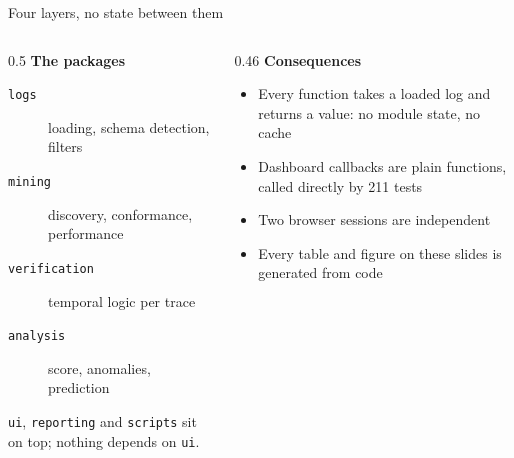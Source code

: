 \documentclass[aspectratio=169]{beamer}
\begin{document}
\begin{frame}{Four layers, no state between them}
\begin{columns}[T]
\begin{column}{0.5\textwidth}
\textbf{The packages}
\begin{description}
  \item[\texttt{logs}] loading, schema detection, filters
  \item[\texttt{mining}] discovery, conformance, performance
  \item[\texttt{verification}] temporal logic per trace
  \item[\texttt{analysis}] score, anomalies, prediction
\end{description}
\smallskip
\texttt{ui}, \texttt{reporting} and \texttt{scripts} sit on top; nothing depends
on \texttt{ui}.
\end{column}
\begin{column}{0.46\textwidth}
\textbf{Consequences}
\begin{itemize}
  \item Every function takes a loaded log and returns a value: no module
        state, no cache
  \item Dashboard callbacks are plain functions, called directly by 211 tests
  \item Two browser sessions are independent
  \item Every table and figure on these slides is generated from code
\end{itemize}
\end{column}
\end{columns}
\end{frame}
\end{document}
